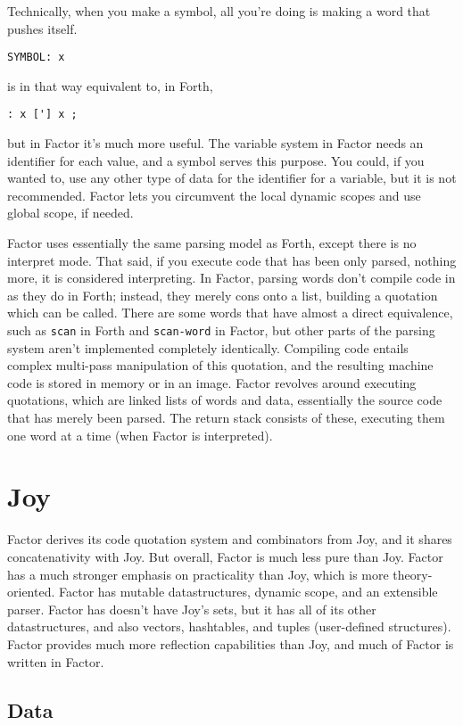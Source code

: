 \documentclass{article}
\begin{document}
Technically, when you make a symbol, all you're doing is making a word that pushes itself.
\begin{verbatim}
SYMBOL: x
\end{verbatim}
is in that way equivalent to, in Forth,
\begin{verbatim}
: x ['] x ;
\end{verbatim}
but in Factor it's much more useful. The variable system in Factor needs an identifier for each value, and a symbol serves this purpose. You could, if you wanted to, use any other type of data for the identifier for a variable, but it is not recommended. Factor lets you circumvent the local dynamic scopes and use global scope, if needed.

Factor uses essentially the same parsing model as Forth, except there is no interpret mode. That said, if you execute code that has been only parsed, nothing more, it is considered interpreting. In Factor, parsing words don't compile code in as they do in Forth; instead, they merely cons onto a list, building a quotation which can be called. There are some words that have almost a direct equivalence, such as \texttt{scan} in Forth and \texttt{scan-word} in Factor, but other parts of the parsing system aren't implemented completely identically. Compiling code entails complex multi-pass manipulation of this quotation, and the resulting machine code is stored in memory or in an image. Factor revolves around executing quotations, which are linked lists of words and data, essentially the source code that has merely been parsed. The return stack consists of these, executing them one word at a time (when Factor is interpreted).


\section{Joy}

Factor derives its code quotation system and combinators from Joy, and it shares concatenativity with Joy. But overall, Factor is much less pure than Joy. Factor has a much stronger emphasis on practicality than Joy, which is more theory-oriented. Factor has mutable datastructures, dynamic scope, and an extensible parser. Factor has doesn't have Joy's sets, but it has all of its other datastructures, and also vectors, hashtables, and tuples (user-defined structures). Factor provides much more reflection capabilities than Joy, and much of Factor is written in Factor.

\subsection{Data}
\end{document}
